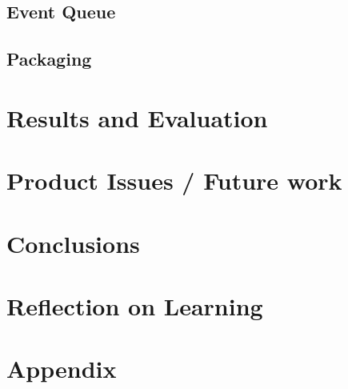 \documentclass[12pt, conference, final, a4paper, onecolumn, compsoc]{IEEEtran}
\begin{document}
    \subsection*{Event Queue}

    \subsection*{Packaging}

    \section{Results and Evaluation}
    \subsection*{}

    \section{Product Issues / Future work} %
    \subsection*{}

    \section{Conclusions}
    \subsection*{}

    \section{Reflection on Learning} %
    \subsection*{}

    \section{Appendix}
     

  
\end{document}
